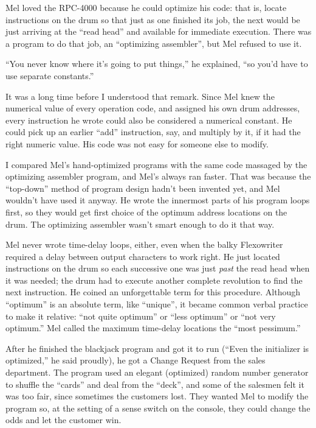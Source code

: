 \documentclass[12pt]{article}
\begin{document}
\bigskip
\noindent
Mel loved the RPC-4000
because he could optimize his code:
that is, locate instructions on the drum
so that just as one finished its job,
the next would be just arriving at the ``read head''
and available for immediate execution.
There was a program to do that job,
an ``optimizing assembler'',
but Mel refused to use it.

\bigskip
\noindent
``You never know where it's going to put things,''
he explained, ``so you'd have to use separate constants.''

\bigskip
\noindent
It was a long time before I understood that remark.
Since Mel knew the numerical value
of every operation code,
and assigned his own drum addresses,
every instruction he wrote could also be considered
a numerical constant.
He could pick up an earlier ``add'' instruction, say,
and multiply by it,
if it had the right numeric value.
His code was not easy for someone else to modify.

\bigskip
\noindent
I compared Mel's hand-optimized programs
with the same code massaged by the optimizing assembler program,
and Mel's always ran faster.
That was because the ``top-down'' method of program design
hadn't been invented yet,
and Mel wouldn't have used it anyway.
He wrote the innermost parts of his program loops first,
so they would get first choice
of the optimum address locations on the drum.
The optimizing assembler wasn't smart enough to do it that way.

\bigskip
\noindent
Mel never wrote time-delay loops, either,
even when the balky Flexowriter
required a delay between output characters to work right.
He just located instructions on the drum
so each successive one was just {\it past} the read head
when it was needed;
the drum had to execute another complete revolution
to find the next instruction.
He coined an unforgettable term for this procedure.
Although ``optimum'' is an absolute term,
like ``unique'', it became common verbal practice
to make it relative:
``not quite optimum'' or ``less optimum''
or ``not very optimum.''
Mel called the maximum time-delay locations
the ``most pessimum.''

\bigskip
\noindent
After he finished the blackjack program
and got it to run
(``Even the initializer is optimized,''
he said proudly),
he got a Change Request from the sales department.
The program used an elegant (optimized)
random number generator
to shuffle the ``cards'' and deal from the ``deck'',
and some of the salesmen felt it was too fair,
since sometimes the customers lost.
They wanted Mel to modify the program
so, at the setting of a sense switch on the console,
they could change the odds and let the customer win.
\end{document}
